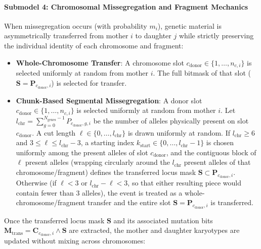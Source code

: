 \documentclass[11pt,a4paper]{article}
\begin{document}
\paragraph{Submodel 4: Chromosomal Missegregation and Fragment Mechanics}
When missegregation occurs (with probability $m_i$), genetic material is asymmetrically transferred from mother $i$ to daughter $j$ while strictly preserving the individual identity of each chromosome and fragment:
\begin{itemize}
    \item \textbf{Whole-Chromosome Transfer}: A chromosome slot $c_{\text{donor}} \in \{1, \dots, n_{c, i}\}$ is selected uniformly at random from mother $i$. The full bitmask of that slot ($\mathbf{S} = \mathbf{P}_{c_{\text{donor}}, i}$) is selected for transfer.
    \item \textbf{Chunk-Based Segmental Missegregation}: A donor slot $c_{\text{donor}} \in \{1, \dots, n_{c, i}\}$ is selected uniformly at random from mother $i$. Let $l_{\text{chr}} = \sum_{g=0}^{N_{\text{genes}}-1} P_{c_{\text{donor}}, g, i}$ be the number of alleles physically present on slot $c_{\text{donor}}$. A cut length $\ell \in \{0, \dots, l_{\text{chr}}\}$ is drawn uniformly at random. If $l_{\text{chr}} \ge 6$ and $3 \le \ell \le l_{\text{chr}} - 3$, a starting index $k_{\text{start}} \in \{0, \dots, l_{\text{chr}}-1\}$ is chosen uniformly among the present alleles of slot $c_{\text{donor}}$, and the contiguous block of $\ell$ present alleles (wrapping circularly around the $l_{\text{chr}}$ present alleles of that chromosome/fragment) defines the transferred locus mask $\mathbf{S} \subset \mathbf{P}_{c_{\text{donor}}, i}$. Otherwise (if $\ell < 3$ or $l_{\text{chr}} - \ell < 3$, so that either resulting piece would contain fewer than $3$ alleles), the event is treated as a whole-chromosome/fragment transfer and the entire slot $\mathbf{S} = \mathbf{P}_{c_{\text{donor}}, i}$ is transferred.
\end{itemize}
Once the transferred locus mask $\mathbf{S}$ and its associated mutation bits $\mathbf{M}_{\text{trans}} = \mathbf{C}_{c_{\text{donor}}, i} \land \mathbf{S}$ are extracted, the mother and daughter karyotypes are updated without mixing across chromosomes:
\end{document}
